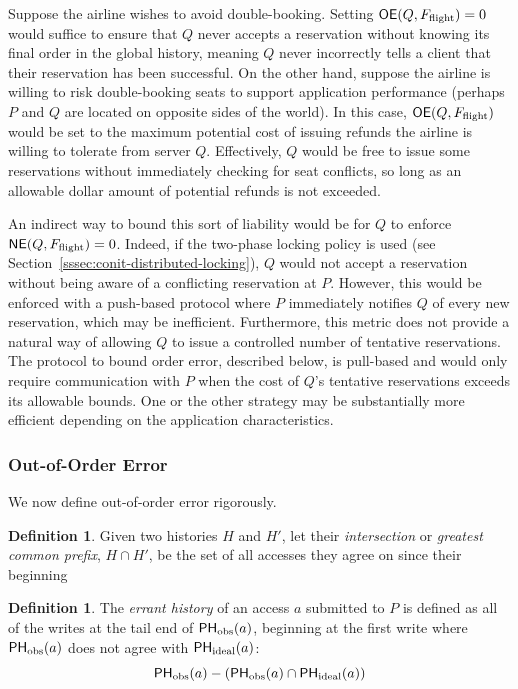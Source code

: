 \documentclass[]             %
{NASA}                       %
\theoremstyle{definition}
\newtheorem{definition}[theorem]{Definition}
\begin{document}
Suppose the airline wishes to avoid double-booking. Setting
$\mathsf{OE}(Q, F_{\textrm{flight}}) = 0$ would suffice to ensure that $Q$
never accepts a reservation without knowing its final order in the
global history, meaning $Q$ never incorrectly tells a client that
their reservation has been successful. On the other hand, suppose the
airline is willing to risk double-booking seats to support application
performance (perhaps $P$ and $Q$ are located on opposite sides of the
world). In this case, $\mathsf{OE}(Q, F_{\textrm{flight}})$ would be set to
the maximum potential cost of issuing refunds the airline is willing
to tolerate from server $Q$. Effectively, $Q$ would be free to issue
some reservations without immediately checking for seat conflicts, so
long as an allowable dollar amount of potential refunds is not
exceeded.

An indirect way to bound this sort of liability would be for $Q$ to
enforce $\mathsf{NE}(Q, F_{\textrm{flight}}) = 0$. Indeed, if the two-phase
locking policy is used (see
Section~\ref{sssec:conit-distributed-locking}), $Q$ would not accept a
reservation without being aware of a conflicting reservation at
$P$. However, this would be enforced with a push-based protocol where
$P$ immediately notifies $Q$ of every new reservation, which may be
inefficient. Furthermore, this metric does not provide a natural way
of allowing $Q$ to issue a controlled number of tentative
reservations. The protocol to bound order error, described below, is
pull-based and would only require communication with $P$ when the cost
of $Q$'s tentative reservations exceeds its allowable bounds. One or
the other strategy may be substantially more efficient depending on
the application characteristics.

\subsubsection{Out-of-Order Error}

We now define out-of-order error rigorously.

\begin{definition}
  Given two histories $H$ and $H'$, let their \emph{intersection} or
  \emph{greatest common prefix}, $H \cap H'$, be the set of all
  accesses they agree on since their beginning
\end{definition}

\begin{definition}
  The \emph{errant history} of an access $a$ submitted to $P$ is defined
  as all of the writes at the tail end of $\mathsf{PH}_{\mathrm{obs}}(a)$, beginning at the
  first write where $\mathsf{PH}_{\mathrm{obs}}(a)$ does not agree with $\mathsf{PH}_{\mathrm{ideal}}(a)$:
  \begin{equation*} \mathsf{PH}_{\mathrm{obs}}(a) - \left(\mathsf{PH}_{\mathrm{obs}}(a) \cap \mathsf{PH}_{\mathrm{ideal}}(a)\right)
  \end{equation*}
\end{definition}
\end{document}
